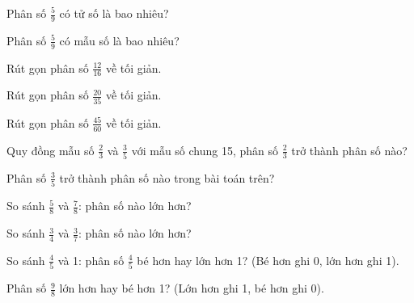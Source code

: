 \begin{ex}
Phân số $\frac{5}{9}$ có tử số là bao nhiêu?
\end{ex}

\begin{ex}
Phân số $\frac{5}{9}$ có mẫu số là bao nhiêu?
\end{ex}

\begin{ex}
Rút gọn phân số $\frac{12}{16}$ về tối giản.
\end{ex}

\begin{ex}
Rút gọn phân số $\frac{20}{35}$ về tối giản.
\end{ex}

\begin{ex}
Rút gọn phân số $\frac{45}{60}$ về tối giản.
\end{ex}

\begin{ex}
Quy đồng mẫu số $\frac{2}{3}$ và $\frac{3}{5}$ với mẫu số chung 15, phân số $\frac{2}{3}$ trở thành phân số nào?
\end{ex}

\begin{ex}
Phân số $\frac{3}{5}$ trở thành phân số nào trong bài toán trên?
\end{ex}

\begin{ex}
So sánh $\frac{5}{8}$ và $\frac{7}{8}$: phân số nào lớn hơn?
\end{ex}

\begin{ex}
So sánh $\frac{3}{4}$ và $\frac{3}{7}$: phân số nào lớn hơn?
\end{ex}

\begin{ex}
So sánh $\frac{4}{5}$ và 1: phân số $\frac{4}{5}$ bé hơn hay lớn hơn 1? (Bé hơn ghi 0, lớn hơn ghi 1).
\end{ex}

\begin{ex}
Phân số $\frac{9}{8}$ lớn hơn hay bé hơn 1? (Lớn hơn ghi 1, bé hơn ghi 0).
\end{ex}

